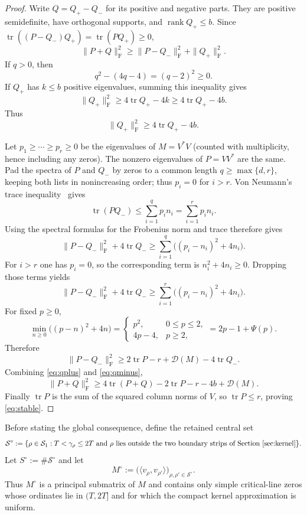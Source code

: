 \documentclass[11pt]{article}
\DeclareMathOperator{\tr}{tr}
\newcommand{\Frob}{\mathrm F}
\newcommand{\cS}{\mathcal S}
\newcommand{\cD}{\mathcal D}
\begin{document}
\begin{proof}
Write $Q=Q_+-Q_-$ for its positive and negative parts.  They are positive
semidefinite, have orthogonal supports, and $\operatorname{rank}Q_+\le b$.
Since $\tr((P-Q_-)Q_+)=\tr(PQ_+)\ge0$,
\[
 \|P+Q\|_{\Frob}^2
 \ge \|P-Q_-\|_{\Frob}^2+\|Q_+\|_{\Frob}^2.
\]
If $q>0$, then
\[
 q^2-(4q-4)=(q-2)^2\ge0.
\]
If $Q_+$ has $k\le b$ positive eigenvalues, summing this inequality gives
\[
 \|Q_+\|_{\Frob}^2
 \ge4\tr Q_+-4k
 \ge4\tr Q_+-4b.
\]
Thus
\begin{equation}\label{eq:qplus}
 \|Q_+\|_{\Frob}^2\ge4\tr Q_+-4b.
\end{equation}

Let $p_1\ge\cdots\ge p_r\ge0$ be the eigenvalues of $M=V^*V$
(counted with multiplicity, hence including any zeros).  The nonzero
eigenvalues of $P=VV^*$ are the same.  Pad the spectra of $P$ and $Q_-$ by
zeros to a common length $q\ge\max\{d,r\}$, keeping both lists in
nonincreasing order; thus $p_i=0$ for $i>r$.  Von Neumann's trace
inequality~\cite{Bhatia97} gives
\[
 \tr(PQ_-)\le\sum_{i=1}^{q}p_i n_i
 =\sum_{i=1}^{r}p_i n_i.
\]
Using the spectral formulas for the Frobenius norm and trace therefore gives
\[
 \|P-Q_-\|_{\Frob}^2+4\tr Q_-
 \ge
 \sum_{i=1}^{q}\bigl((p_i-n_i)^2+4n_i\bigr).
\]
For $i>r$ one has $p_i=0$, so the corresponding term is
$n_i^2+4n_i\ge0$.  Dropping those terms yields
\[
 \|P-Q_-\|_{\Frob}^2+4\tr Q_-
 \ge\sum_{i=1}^{r}\bigl((p_i-n_i)^2+4n_i\bigr).
\]
For fixed $p\ge0$,
\[
 \min_{n\ge0}\bigl((p-n)^2+4n\bigr)
 =
 \begin{cases}
 p^2,&0\le p\le2,\\
 4p-4,&p\ge2,
 \end{cases}
 =2p-1+\Psi(p).
\]
Therefore
\begin{equation}\label{eq:qminus}
 \|P-Q_-\|_{\Frob}^2
 \ge2\tr P-r+\cD(M)-4\tr Q_-.
\end{equation}
Combining \eqref{eq:qplus} and \eqref{eq:qminus},
\[
 \|P+Q\|_{\Frob}^2
 \ge4\tr(P+Q)-2\tr P-r-4b+\cD(M).
\]
Finally $\tr P$ is the sum of the squared column norms of $V$, so
$\tr P\le r$, proving \eqref{eq:stable}.
\end{proof}

Before stating the global consequence, define the retained central set
\begin{equation}\label{eq:Scentral}
 \cS^\circ:=\{\rho\in\cS_1:T<\gamma_\rho\le2T\text{ and }\rho
 \text{ lies outside the two boundary strips of Section~\ref{sec:kernel}}\}.
\end{equation}
Let $S^\circ:=\#\cS^\circ$ and let
\begin{equation}\label{eq:Mcircdef}
 M^\circ:=\bigl(\langle v_\rho,v_{\rho'}\rangle\bigr)_{\rho,\rho'\in\cS^\circ}.
\end{equation}
Thus $M^\circ$ is a principal submatrix of $M$ and contains only simple
critical-line zeros whose ordinates lie in $(T,2T]$ and for which the compact
kernel approximation is uniform.
\end{document}
